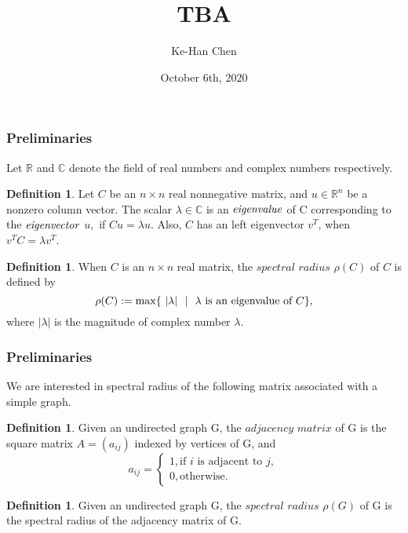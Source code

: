 \documentclass[]{beamer}
\theoremstyle{plain}
\theoremstyle{definition}
\newtheorem{defn}[thm]{Definition}
\begin{document}
\title[]{TBA}
\author[]{Ke-Han Chen} %
\date{October 6th, 2020}

\begin{frame}
    \maketitle
\end{frame}

\begin{frame}
    \frametitle{Preliminaries}
    Let $\mathbb{R}$ and $\mathbb{C}$ denote the field of real numbers and complex numbers respectively.


    \begin{defn}
        Let $C$ be an $n \times n$ real nonnegative matrix, and $u \in \mathbb{R}^n$ be a nonzero column vector. The scalar $\lambda \in \mathbb{C}$ is an $\it{eigenvalue}$ of C corresponding to the $\it{eigenvector}$ $u,$  if $Cu = \lambda u.$
        Also, $C$ has an left eigenvector $v^T$, when $v^TC=\lambda v^T$.
    \end{defn}

    \begin{defn}

    When $C$ is an $n \times n$ real matrix, the $\textit {spectral radius} $ $\rho(C)$ of $C$ is defined by
    $$\rho(C):=\max\{~|\lambda|~\ |~~\lambda\hbox{ is an eigenvalue of $C$}\},$$
    where $|\lambda|$ is the magnitude of complex number $\lambda.$
    \end{defn}
\end{frame}

\begin{frame}
    \frametitle{Preliminaries}

    We are interested in spectral radius of the following matrix associated with a simple graph.

    \begin{defn} Given an undirected graph
    G, the$\textit{ adjacency matrix}$ of G is the square matrix $A = (a_{ij})$ indexed by vertices of G,
    and
    \[a_{ij} =\begin{cases}
    1, \text{if $i$ is adjacent to $j$}, \\
    0, \text{otherwise.}
    \end{cases}
    \]
    
    \end{defn}
    
    \begin{defn}
    Given an undirected graph G, the $\textit{spectral radius}$  $\rho(G) $ of G is the spectral radius of the adjacency matrix of G.
    \end{defn}

\end{frame}
\end{document}
